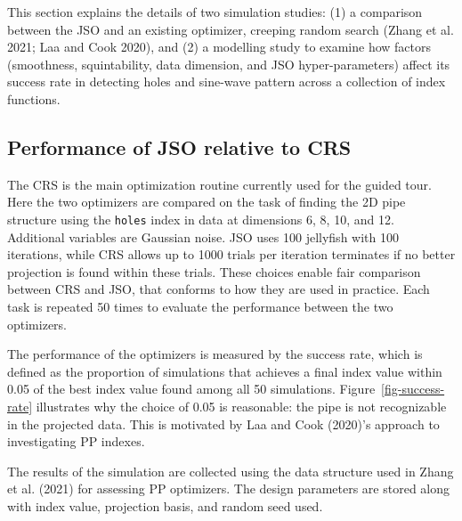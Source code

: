 \documentclass[
  12pt,
]{interact}
\theoremstyle{plain}
\begin{document}
This section explains the details of two simulation studies: (1) a
comparison between the JSO and an existing optimizer, creeping random
search (Zhang et al. 2021; Laa and Cook 2020), and (2) a modelling study
to examine how factors (smoothness, squintability, data dimension, and
JSO hyper-parameters) affect its success rate in detecting holes and
sine-wave pattern across a collection of index functions.

\subsection{Performance of JSO relative to CRS}\label{sec-app-1}

The CRS is the main optimization routine currently used for the guided
tour. Here the two optimizers are compared on the task of finding the 2D
pipe structure using the \texttt{holes} index in data at dimensions 6,
8, 10, and 12. Additional variables are Gaussian noise. JSO uses 100
jellyfish with 100 iterations, while CRS allows up to 1000 trials per
iteration terminates if no better projection is found within these
trials. These choices enable fair comparison between CRS and JSO, that
conforms to how they are used in practice. Each task is repeated 50
times to evaluate the performance between the two optimizers.

The performance of the optimizers is measured by the success rate, which
is defined as the proportion of simulations that achieves a final index
value within 0.05 of the best index value found among all 50
simulations. Figure~\ref{fig-success-rate} illustrates why the choice of
0.05 is reasonable: the pipe is not recognizable in the projected data.
This is motivated by Laa and Cook (2020)'s approach to investigating PP
indexes.

The results of the simulation are collected using the data structure
used in Zhang et al. (2021) for assessing PP optimizers. The design
parameters are stored along with index value, projection basis, and
random seed used.
\end{document}
